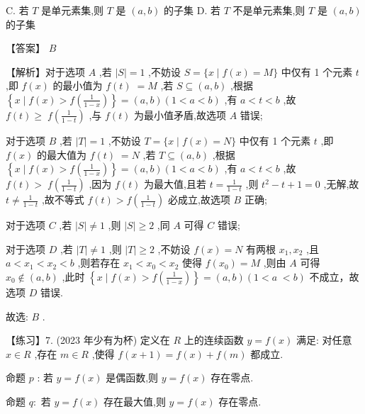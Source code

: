 \documentclass[10pt]{article}
\begin{document}
C. 若 \(T\) 是单元素集,则 \(T\) 是 \(\left( {a,b}\right)\) 的子集 D. 若 \(T\) 不是单元素集,则 \(T\) 是 \(\left( {a,b}\right)\) 的子集

【答案】 \(B\)

【解析】对于选项 \(A\) ,若 \(\left| S\right|  = 1\) ,不妨设 \(S = \{ x \mid  f\left( x\right)  = M\}\) 中仅有 1 个元素 \(t\) ,即 \(f\left( x\right)\) 的最小值为 \(f\left( t\right) \; = M\) ,若 \(S \subseteq  \left( {a,b}\right)\) ,根据 \(\left\{  {x \mid  f\left( x\right)  > f\left( \frac{1}{1 - x}\right) }\right\}   = \left( {a,b}\right) \left( {1 < a < b}\right)\) ,有 \(a < t < b\) ,故 \(f\left( t\right)  \geq \; f\left( \frac{1}{1 - t}\right)\) ,与 \(f\left( t\right)\) 为最小值矛盾,故选项 \(A\) 错误;

对于选项 \(B\) ,若 \(\left| T\right|  = 1\) ,不妨设 \(T = \{ x \mid  f\left( x\right)  = N\}\) 中仅有 1 个元素 \(t\) ,即 \(f\left( x\right)\) 的最大值为 \(f\left( t\right) \; = N\) ,若 \(T \subseteq  \left( {a,b}\right)\) ,根据 \(\left\{  {x \mid  f\left( x\right)  > f\left( \frac{1}{1 - x}\right) }\right\}   = \left( {a,b}\right) \left( {1 < a < b}\right)\) ,有 \(a < t < b\) ,故 \(f\left( t\right)  > \; f\left( \frac{1}{1 - t}\right)\) ,因为 \(f\left( t\right)\) 为最大值,且若 \(t = \frac{1}{1 - t}\) ,则 \({t}^{2} - t + 1 = 0\) ,无解,故 \(t \neq  \frac{1}{1 - t}\) ,故不等式 \(f\left( t\right)  > f\left( \frac{1}{1 - t}\right)\) 必成立,故选项 \(B\) 正确;

对于选项 \(C\) ,若 \(\left| S\right|  \neq  1\) ,则 \(\left| S\right|  \geq  2\) ,同 \(A\) 可得 \(C\) 错误;

对于选项 \(D\) ,若 \(\left| T\right|  \neq  1\) ,则 \(\left| T\right|  \geq  2\) ,不妨设 \(f\left( x\right)  = N\) 有两根 \({x}_{1},{x}_{2}\) ,且 \(a < {x}_{1} < {x}_{2} < b\) ,则若存在 \({x}_{1} < {x}_{0} < {x}_{2}\) 使得 \(f\left( {x}_{0}\right)  = M\) ,则由 \(A\) 可得 \({x}_{0} \notin  \left( {a,b}\right)\) ,此时 \(\left\{  {x \mid  f\left( x\right)  > f\left( \frac{1}{1 - x}\right) }\right\}   = \left( {a,b}\right) (1 < a \; < b)\) 不成立，故选项 \(D\) 错误.

故选: \(B\) .

【练习】7. (2023 年少有为杯) 定义在 \(R\) 上的连续函数 \(y = f\left( x\right)\) 满足: 对任意 \(x \in  R\) ,存在 \(m \in  R\) ,使得 \(f\left( {x + 1}\right)  = f\left( x\right)  + f\left( m\right)\) 都成立.

命题 \(p\) : 若 \(y = f\left( x\right)\) 是偶函数,则 \(y = f\left( x\right)\) 存在零点.

命题 \(q :\) 若 \(y = f\left( x\right)\) 存在最大值,则 \(y = f\left( x\right)\) 存在零点.
\end{document}
